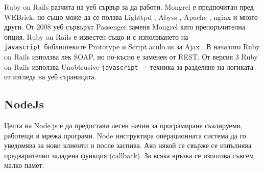 \documentclass[a4paper]{article}
\def\js{\texttt{javascript}}
\begin{document}
  Ruby on Rails разчита на уеб сървър за да работи. Mongrel е предпочитан пред WEBrick, но също може да се ползва Lighttpd \cite{lighttpd}, Abyss \cite{abyss}, Apache \cite{apache}, nginx \cite{nginx} и много други. От 2008 уеб сървърът Passenger \cite{passenger} заменя Mongrel като препоръчителна опция.
  Ruby on Rails е известен също и с използването на \js\ библиотеките Prototype \cite{prototype} и Script.aculo.us за Ajax \cite{ajax}. В началото Ruby on Rails използва лек SOAP, но по-късно е заменен от REST. От версия 3 Ruby on Rails използва Unobtrusive \js\ \cite{unobtrusive} -- техника за разделяне на логиката от изгледа на уеб страницата.
  \subsection{NodeJs}
  Целта на Node.js \cite{node} е да предостави лесен начин за програмиране скалируеми, работещи в мрежа програми. Node инструктира операционната система да го уведомява за нови клиенти и после заспива. Ако някой се свърже се изпълнява предварително зададена функция (callback). За всяка връзка се използва съвсем малко памет.
\end{document}
